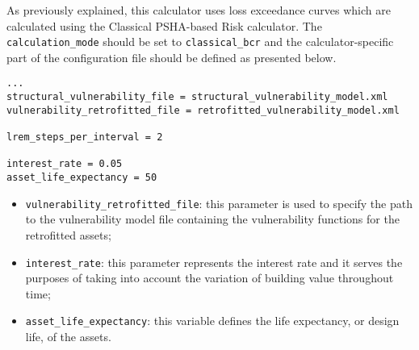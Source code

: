 As previously explained, this calculator uses loss exceedance curves which are
calculated using the Classical PSHA-based Risk calculator. The
\Verb+calculation_mode+ should be set to \Verb+classical_bcr+ and the
calculator-specific part of the configuration file should be defined as
presented below.

\begin{Verbatim}[frame=single, commandchars=\\\{\}, samepage=true]
...
structural_vulnerability_file = structural_vulnerability_model.xml
vulnerability_retrofitted_file = retrofitted_vulnerability_model.xml

lrem_steps_per_interval = 2

interest_rate = 0.05
asset_life_expectancy = 50
\end{Verbatim}

\begin{itemize}
\item  \Verb+vulnerability_retrofitted_file+: this parameter is used to specify the path to the \gls{vulnerability model} file containing the \glspl{vulnerability function} for the retrofitted assets;
\item  \Verb+interest_rate+: this parameter represents the interest rate and it serves the purposes of taking into account the variation of building value throughout time;
\item  \Verb+asset_life_expectancy+: this variable defines the life expectancy, or design life, of the assets.
\end{itemize}